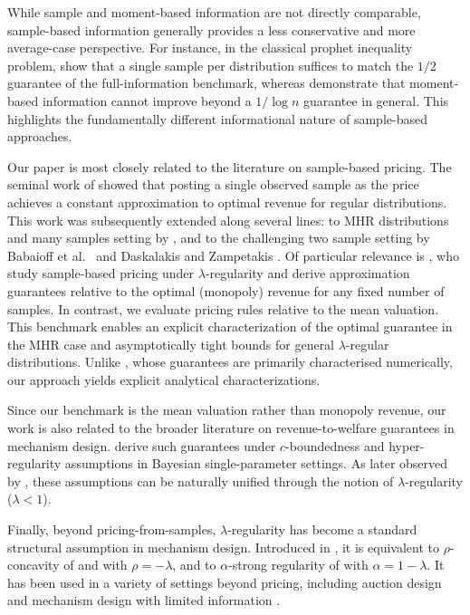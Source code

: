 \documentclass[11pt]{article}
\begin{document}
While sample and moment-based information are not directly comparable, sample-based information generally provides a less conservative and more average-case perspective.
For instance, in the classical prophet inequality problem, \citet{rubinstein2020optimal} show that a single sample per distribution suffices to match the $1/2$ guarantee of the full-information benchmark, whereas \citet{correa2026informativeness} demonstrate that moment-based information cannot improve beyond a $1/\log n$ guarantee in general. This highlights the fundamentally different informational nature of sample-based approaches.



Our paper is most closely related to the literature on sample-based pricing. The seminal work of \citet{dhangwatnotai2010revenue} showed that posting a single observed sample as the price achieves a constant approximation to optimal revenue for regular distributions. 
This work was subsequently extended along several lines: to MHR distributions and many samples setting by \citet{huang2018making}, and to the challenging two sample setting by Babaioff et al.~\cite{babaioff2018two} and Daskalakis and Zampetakis \cite{daskalakis2020more}.
Of particular relevance is \citet{allouah2022pricing}, who study sample-based pricing under $\lambda$-regularity and derive approximation guarantees relative to the optimal (monopoly) revenue for any fixed number of samples.
In contrast, we evaluate pricing rules relative to the mean valuation. This benchmark enables an explicit characterization of the optimal guarantee in the MHR case and asymptotically tight bounds for general $\lambda$-regular distributions. Unlike \citet{allouah2022pricing}, whose guarantees are primarily characterised numerically, our approach yields explicit analytical characterizations.


Since our benchmark is the mean valuation rather than monopoly revenue, our work is also related to the broader literature on revenue-to-welfare guarantees in mechanism design. \citet{kleinberg2013ratio} derive such guarantees under $c$-boundedness and hyper-regularity assumptions in Bayesian single-parameter settings. As later observed by \citet{schweizer2019performance}, these assumptions can be naturally unified through the notion of $\lambda$-regularity ($\lambda<1$). 

Finally, beyond pricing-from-samples, $\lambda$-regularity has become a standard structural assumption in mechanism design. Introduced in \citet{schweizer2019performance}, it is equivalent to $\rho$-concavity of \citet{mares2011near} and \citet{ewerhart2013regular} with $\rho=-\lambda$, and to $\alpha$-strong regularity of \citet{cole2014sample} with $\alpha=1-\lambda$. It has been used in a variety of settings beyond pricing, including auction design and mechanism design with limited information \cite{cole2017applications,mares2014analysis,giannakopoulos2021optimal,ge2025optimal,allouah2023optimal}.
\end{document}

